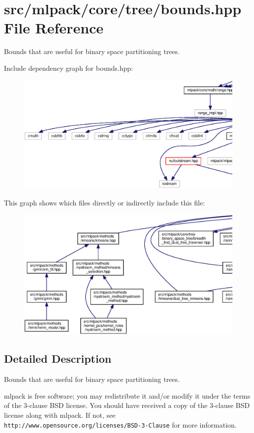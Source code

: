 \section{src/mlpack/core/tree/bounds.hpp File Reference}
\label{bounds_8hpp}


Bounds that are useful for binary space partitioning trees.  


Include dependency graph for bounds.\+hpp\+:
\nopagebreak
\begin{figure}[H]
\begin{center}
\leavevmode
\includegraphics[width=350pt]{bounds_8hpp__incl}
\end{center}
\end{figure}
This graph shows which files directly or indirectly include this file\+:
\nopagebreak
\begin{figure}[H]
\begin{center}
\leavevmode
\includegraphics[width=350pt]{bounds_8hpp__dep__incl}
\end{center}
\end{figure}


\subsection{Detailed Description}
Bounds that are useful for binary space partitioning trees. 

mlpack is free software; you may redistribute it and/or modify it under the terms of the 3-\/clause B\+SD license. You should have received a copy of the 3-\/clause B\+SD license along with mlpack. If not, see {\tt http\+://www.\+opensource.\+org/licenses/\+B\+S\+D-\/3-\/\+Clause} for more information. 